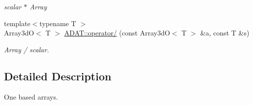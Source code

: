 \begin{DoxyCompactItemize}
\begin{DoxyCompactList}\small\item\em scalar $\ast$ Array \end{DoxyCompactList}\item 
{\footnotesize template$<$typename T $>$ }\\Array3dO$<$ T $>$ \mbox{\hyperlink{namespaceADAT_a12fe989a3965397dc5f1f6003582023f}{A\+D\+A\+T\+::operator/}} (const Array3dO$<$ T $>$ \&a, const T \&s)
\begin{DoxyCompactList}\small\item\em Array / scalar. \end{DoxyCompactList}\end{DoxyCompactItemize}


\subsection{Detailed Description}
One based arrays. 

